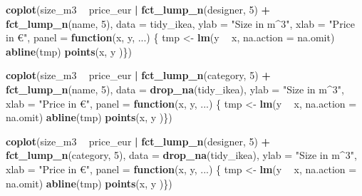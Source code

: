 \documentclass[a4paper, nobind]{templates/ociamthesis}
\newenvironment{Shaded}{\begin{snugshade}}{\end{snugshade}}
\newcommand{\ControlFlowTok}[1]{\textcolor[rgb]{0.13,0.29,0.53}{\textbf{#1}}}
\newcommand{\DataTypeTok}[1]{\textcolor[rgb]{0.13,0.29,0.53}{#1}}
\newcommand{\DecValTok}[1]{\textcolor[rgb]{0.00,0.00,0.81}{#1}}
\newcommand{\KeywordTok}[1]{\textcolor[rgb]{0.13,0.29,0.53}{\textbf{#1}}}
\newcommand{\NormalTok}[1]{#1}
\newcommand{\OperatorTok}[1]{\textcolor[rgb]{0.81,0.36,0.00}{\textbf{#1}}}
\newcommand{\StringTok}[1]{\textcolor[rgb]{0.31,0.60,0.02}{#1}}
\renewenvironment{Shaded}
{
  \vspace{4pt}%
  \begin{snugshade}%
}{%
  \end{snugshade}%
  \vspace{4pt}%
}
\begin{document}
\begin{Shaded}
\begin{Highlighting}[]
\KeywordTok{coplot}\NormalTok{(size_m3 }\OperatorTok{~}\StringTok{ }\NormalTok{price_eur }\OperatorTok{|}\StringTok{ }\KeywordTok{fct_lump_n}\NormalTok{(designer, }\DecValTok{5}\NormalTok{) }\OperatorTok{+}\StringTok{ }\KeywordTok{fct_lump_n}\NormalTok{(name, }\DecValTok{5}\NormalTok{), }\DataTypeTok{data =}\NormalTok{ tidy_ikea, }\DataTypeTok{ylab =} \StringTok{"Size in m^3"}\NormalTok{,}
       \DataTypeTok{xlab =} \StringTok{"Price in €"}\NormalTok{, }\DataTypeTok{panel =} \ControlFlowTok{function}\NormalTok{(x, y, ...) \{}
\NormalTok{         tmp <-}\StringTok{ }\KeywordTok{lm}\NormalTok{(y }\OperatorTok{~}\StringTok{ }\NormalTok{x, }\DataTypeTok{na.action =}\NormalTok{ na.omit)}
         \KeywordTok{abline}\NormalTok{(tmp)}
         \KeywordTok{points}\NormalTok{(x, y )\})}

\KeywordTok{coplot}\NormalTok{(size_m3 }\OperatorTok{~}\StringTok{ }\NormalTok{price_eur }\OperatorTok{|}\StringTok{ }\KeywordTok{fct_lump_n}\NormalTok{(category, }\DecValTok{5}\NormalTok{) }\OperatorTok{+}\StringTok{ }\KeywordTok{fct_lump_n}\NormalTok{(name, }\DecValTok{5}\NormalTok{), }\DataTypeTok{data =} \KeywordTok{drop_na}\NormalTok{(tidy_ikea), }\DataTypeTok{ylab =} \StringTok{"Size in m^3"}\NormalTok{,}
       \DataTypeTok{xlab =} \StringTok{"Price in €"}\NormalTok{, }\DataTypeTok{panel =} \ControlFlowTok{function}\NormalTok{(x, y, ...) \{}
\NormalTok{         tmp <-}\StringTok{ }\KeywordTok{lm}\NormalTok{(y }\OperatorTok{~}\StringTok{ }\NormalTok{x, }\DataTypeTok{na.action =}\NormalTok{ na.omit)}
         \KeywordTok{abline}\NormalTok{(tmp)}
         \KeywordTok{points}\NormalTok{(x, y )\})}

\KeywordTok{coplot}\NormalTok{(size_m3 }\OperatorTok{~}\StringTok{ }\NormalTok{price_eur }\OperatorTok{|}\StringTok{ }\KeywordTok{fct_lump_n}\NormalTok{(designer, }\DecValTok{5}\NormalTok{) }\OperatorTok{+}\StringTok{ }\KeywordTok{fct_lump_n}\NormalTok{(category, }\DecValTok{5}\NormalTok{), }\DataTypeTok{data =} \KeywordTok{drop_na}\NormalTok{(tidy_ikea), }\DataTypeTok{ylab =} \StringTok{"Size in m^3"}\NormalTok{,}
       \DataTypeTok{xlab =} \StringTok{"Price in €"}\NormalTok{, }\DataTypeTok{panel =} \ControlFlowTok{function}\NormalTok{(x, y, ...) \{}
\NormalTok{         tmp <-}\StringTok{ }\KeywordTok{lm}\NormalTok{(y }\OperatorTok{~}\StringTok{ }\NormalTok{x, }\DataTypeTok{na.action =}\NormalTok{ na.omit)}
         \KeywordTok{abline}\NormalTok{(tmp)}
         \KeywordTok{points}\NormalTok{(x, y )\})}
\end{Highlighting}
\end{Shaded}
\end{document}
